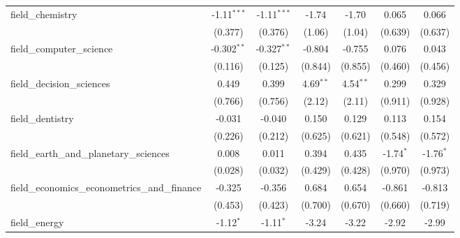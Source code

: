 \begin{tabular}{lcccccc}
   field\_chemistry                                            & -1.11$^{***}$  & -1.11$^{***}$  & -1.74          & -1.70          & 0.065          & 0.066\\   
                                                               & (0.377)        & (0.376)        & (1.06)         & (1.04)         & (0.639)        & (0.637)\\   
   field\_computer\_science                                    & -0.302$^{**}$  & -0.327$^{**}$  & -0.804         & -0.755         & 0.076          & 0.043\\   
                                                               & (0.116)        & (0.125)        & (0.844)        & (0.855)        & (0.460)        & (0.456)\\   
   field\_decision\_sciences                                   & 0.449          & 0.399          & 4.69$^{**}$    & 4.54$^{**}$    & 0.299          & 0.329\\   
                                                               & (0.766)        & (0.756)        & (2.12)         & (2.11)         & (0.911)        & (0.928)\\   
   field\_dentistry                                            & -0.031         & -0.040         & 0.150          & 0.129          & 0.113          & 0.154\\   
                                                               & (0.226)        & (0.212)        & (0.625)        & (0.621)        & (0.548)        & (0.572)\\   
   field\_earth\_and\_planetary\_sciences                      & 0.008          & 0.011          & 0.394          & 0.435          & -1.74$^{*}$    & -1.76$^{*}$\\   
                                                               & (0.028)        & (0.032)        & (0.429)        & (0.428)        & (0.970)        & (0.973)\\   
   field\_economics\_econometrics\_and\_finance                & -0.325         & -0.356         & 0.684          & 0.654          & -0.861         & -0.813\\   
                                                               & (0.453)        & (0.423)        & (0.700)        & (0.670)        & (0.660)        & (0.719)\\   
   field\_energy                                               & -1.12$^{*}$    & -1.11$^{*}$    & -3.24          & -3.22          & -2.92          & -2.99\\   

\end{tabular}
